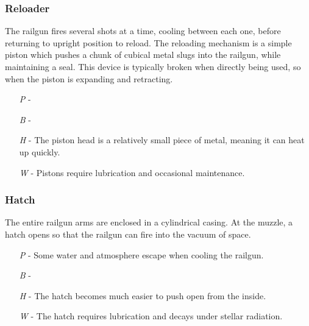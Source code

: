 \documentclass[a4paper]{article}
\begin{document}
\vspace{-0.5cm} \hspace{-18pt} \subsubsection{Reloader} \label{railgun_reloader} \vspace{-0.2cm}
The railgun fires several shots at a time, cooling between each one, before returning to upright position to reload. The reloading mechanism is a simple piston which pushes a chunk of cubical metal slugs into the railgun, while maintaining a seal. This device is typically broken when directly being used, so when the piston is expanding and retracting.
\begin{enumerate}
\item [\textit{P}] -  \\
\item [\textit{B}] -  \\
\item [\textit{H}] - The piston head is a relatively small piece of metal, meaning it can heat up quickly.
\item [\textit{W}] - Pistons require lubrication and occasional maintenance.
\end{enumerate}

\vspace{-0.5cm} \hspace{-18pt} \subsubsection{Hatch} \label{railgun_hatch} \vspace{-0.2cm}
The entire railgun arms are enclosed in a cylindrical casing. At the muzzle, a hatch opens so that the railgun can fire into the vacuum of space. 
\begin{enumerate}
\item [\textit{P}] - Some water and atmosphere escape when cooling the railgun.
\item [\textit{B}] -  \\
\item [\textit{H}] - The hatch becomes much easier to push open from the inside.
\item [\textit{W}] - The hatch requires lubrication and decays under stellar radiation.
\end{enumerate}
\end{document}
